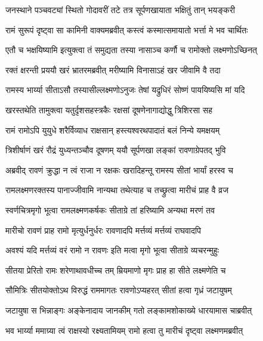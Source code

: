 \twolineshloka
{जनस्थाने पञ्चवट्यां स्थितो गोदावरीं तटे}
{तत्र सूर्पणखायाता भक्षितुं तान् भयङ्करी}%

\twolineshloka
{रामं सुरूपं दृष्ट्वा सा कामिनी वाक्यमब्रवीत्}
{कस्त्वं कस्मात्समायातो भर्त्ता मे भव चार्थितः}%

\twolineshloka
{एतौ च भक्षयिष्यामि इत्युक्त्वा तं समुद्यता }
{तस्या नासाञ्च कर्णौ च रामोक्तो लक्ष्मणोऽच्छिनत्}%

\twolineshloka
{रक्तं क्षरन्ती प्रययौ खरं भ्रातरमब्रवीत्}
{मरीष्यामि विनासाऽहं खर जीवामि वै तदा}%

\twolineshloka
{रामस्य भार्य्या सीताऽसौ तस्यासील्लक्ष्मणोऽनुजः}
{तेषां यद्रुधिरं सोष्णं पाययिष्यसि मां यदि}%

\twolineshloka
{खरस्तथेति तामुक्त्वा यतुर्दृशसहस्त्रकैः}
{रक्षसां दूषणेनागाद्योद्धु त्रिशिरसा सह}%

\twolineshloka
{रामं रामोऽपि युयुधे शरैर्विव्याध राक्षसान्}
{हस्त्यश्वरथपादातं बलं निन्ये यमक्षयम्}%

\twolineshloka
{त्रिशीर्षाणं खरं रौद्रं युध्यन्तञ्चौव दूषणम्}
{ययौ सूर्पणखा लङ्कां रावणाग्रेपतद् भुवि}%

\twolineshloka
{अब्रवीद् रावणं क्रुद्धा न त्वं राजा न रक्षकः}
{खरादिहन्तू रामस्य सीतां भार्यां हरस्व च}%

\twolineshloka
{रामलक्ष्मणरक्तस्य पानाज्जीवामि नान्यथा}
{तथेत्याह च तच्छ्रुत्वा मारीचं प्राह वै व्रज}%

\twolineshloka
{स्वर्णचित्रमृगो भूत्वा रामलक्ष्मणकर्षकः}
{सीताग्रे तां हरिष्यामि अन्यथा मरणं तव}%

\twolineshloka
{मारीचो रावणं प्राह रामो मृत्युर्धनुर्धरः}
{रावणादपि मर्त्तव्यं मर्त्तव्यं राघवादपि}%

\twolineshloka
{अवश्यं यदि मर्त्तव्यं वरं रामो न रावणः}
{इति मत्वा मृगो भूत्वा सीताग्रे व्यचरन्मुहुः}%

\twolineshloka
{सीतया प्रेरितो रामः शरेणाथावधीच्च तम्}
{म्रियमाणो मृगः प्राह हा सीते लक्ष्मणेति च}%

\twolineshloka
{सौमित्रिः सीतयोक्तोऽथ विरुद्धं राममागतः}
{रावणोऽप्यहरत् सीतां हत्वा गृध्रं जटायुषम्}%

\twolineshloka
{जटायुषा स भिन्नाङ्गः अङ्केनादाय जानकीम्}
{गतो लङ्कामशोकाख्ये धारयामास चाब्रवीत्}%

\twolineshloka
{भव भार्य्या ममाग्र्या त्वं राक्षस्यो रक्ष्यतामियम् }
{रामो हत्वा तु मारीचं दृष्ट्वा लक्ष्मणमब्रवीत्}%

